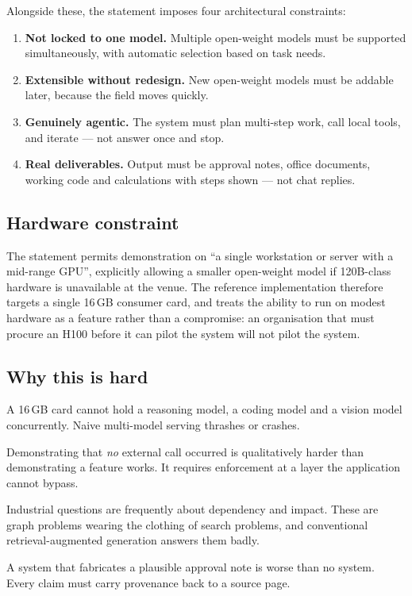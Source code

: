 Alongside these, the statement imposes four architectural constraints:

\begin{enumerate}
\item \textbf{Not locked to one model.} Multiple open-weight models must be
      supported simultaneously, with automatic selection based on task needs.
\item \textbf{Extensible without redesign.} New open-weight models must be
      addable later, because the field moves quickly.
\item \textbf{Genuinely agentic.} The system must plan multi-step work, call
      local tools, and iterate --- not answer once and stop.
\item \textbf{Real deliverables.} Output must be approval notes, office
      documents, working code and calculations with steps shown --- not chat
      replies.
\end{enumerate}

\subsection{Hardware constraint}

The statement permits demonstration on ``a single workstation or server with a
mid-range GPU'', explicitly allowing a smaller open-weight model if 120B-class
hardware is unavailable at the venue. The reference implementation therefore
targets a single 16\,GB consumer card, and treats the ability to run on modest
hardware as a feature rather than a compromise: an organisation that must
procure an H100 before it can pilot the system will not pilot the system.

\subsection{Why this is hard}

\begin{description}[leftmargin=0pt,style=nextline]
\item[Memory is the binding constraint.] A 16\,GB card cannot hold a reasoning
model, a coding model and a vision model concurrently. Naive multi-model
serving thrashes or crashes.
\item[Proving a negative.] Demonstrating that \emph{no} external call occurred
is qualitatively harder than demonstrating a feature works. It requires
enforcement at a layer the application cannot bypass.
\item[Retrieval over structure.] Industrial questions are frequently about
dependency and impact. These are graph problems wearing the clothing of search
problems, and conventional retrieval-augmented generation answers them badly.
\item[Trust in output.] A system that fabricates a plausible approval note is
worse than no system. Every claim must carry provenance back to a source page.
\end{description}
